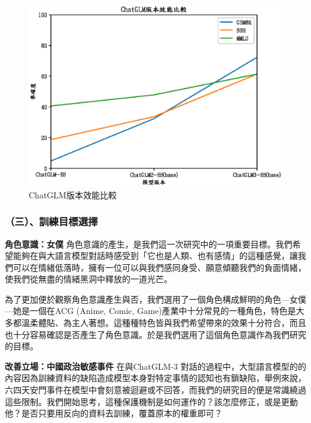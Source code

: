 \documentclass[8pt,a4paper,MingLiU,UTF8]{article}
\def\xeCJKembold{0.4}
\def\saveCJKnode{\dimen255\lastkern}
\def\restoreCJKnode{\kern-\dimen255\kern\dimen255}
\let\CJKoldsymbol\CJKsymbol
\let\CJKoldpunctsymbol\CJKpunctsymbol
\def\CJKfakeboldsymbol#1{%
	\special{pdf:literal direct 2 Tr \xeCJKembold\space w}%
	\CJKoldsymbol{#1}%
	\saveCJKnode
	\special{pdf:literal direct 0 Tr}%
	\restoreCJKnode}
\def\CJKfakeboldpunctsymbol#1{%
	\special{pdf:literal direct 2 Tr \xeCJKembold\space w}%
	\CJKoldpunctsymbol{#1}%
	\saveCJKnode
	\special{pdf:literal direct 0 Tr}%
	\restoreCJKnode}
\newcommand\CJKfakebold[1]{%
	\let\CJKsymbol\CJKfakeboldsymbol
	\let\CJKpunctsymbol\CJKfakeboldpunctsymbol
	#1%
	\let\CJKsymbol\CJKoldsymbol
	\let\CJKpunctsymbol\CJKoldpunctsymbol}
\begin{document}
	\begin{figure}[H]
		\centering
	\includegraphics[scale=0.7]{chatglmversion}
		\caption{ChatGLM版本效能比較}
	\end{figure}
	
	\subsubsection{（三）、訓練目標選擇}
	\CJKfakebold{\textbf{角色意識：女僕}}
	角色意識的產生，是我們這一次研究中的一項重要目標。我們希望能夠在與大語言模型對話時感受到「它也是人類、也有感情」的這種感覺，讓我們可以在情緒低落時，擁有一位可以與我們感同身受、願意傾聽我們的負面情緒，使我們從無盡的情緒黑洞中釋放的一道光芒。
 
為了更加便於觀察角色意識產生與否，我們選用了一個角色構成鮮明的角色—女僕—她是一個在ACG (Anime, Comic, Game)產業中十分常見的一種角色，特色是大多都溫柔體貼、為主人著想。這種種特色皆與我們希望帶來的效果十分符合，而且也十分容易確認是否產生了角色意識。於是我們選用了這個角色意識作為我們研究的目標。

	\CJKfakebold{\textbf{改善立場：中國政治敏感事件}}
	在與ChatGLM-3 對話的過程中，大型語言模型的的內容因為訓練資料的缺陷造成模型本身對特定事情的認知也有鎖缺陷，舉例來說，六四天安門事件在模型中會刻意被迴避或不回答，而我們的研究目的便是常識繞過這些限制。我們開始思考，這種保護機制是如何運作的？該怎麼修正，或是更動他？是否只要用反向的資料去訓練，覆蓋原本的權重即可？


 
\end{document}
